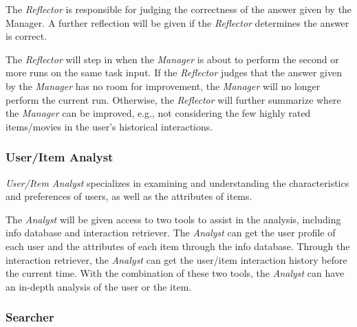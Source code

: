 The \textsl{Reflector} is responsible for judging the correctness of the answer given by the Manager. A further reflection will be given if the \textsl{Reflector} determines the answer is correct.

The \textsl{Reflector} will step in when the \textsl{Manager} is about to perform the second or more runs on the same task input.
If the \textsl{Reflector} judges that the answer given by the \textsl{Manager} has no room for improvement, the \textsl{Manager} will no longer perform the current run. %
Otherwise, the \textsl{Reflector} will further summarize where the \textsl{Manager} can be improved, e.g., not considering the few highly rated items/movies in the user's historical interactions.

\subsubsection{\textbf{User/Item Analyst}}

\textsl{User/Item Analyst} specializes in examining and understanding the characteristics and preferences of users, as well as the attributes of items.

The \textsl{Analyst} will be given access to two tools to assist in the analysis, including info database and interaction retriever.
The \textsl{Analyst} can get the user profile of each user and the attributes of each item through the info database.
Through the interaction retriever, the \textsl{Analyst} can get the user/item interaction history before the current time.
With the combination of these two tools, the \textsl{Analyst} can have an in-depth analysis of the user or the item.

\subsubsection{\textbf{Searcher}}

